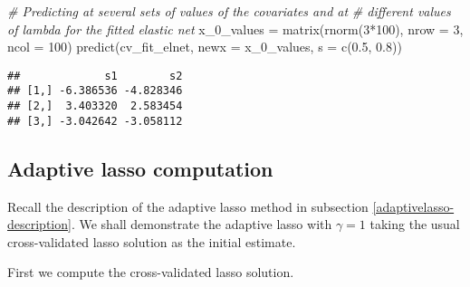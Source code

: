 \documentclass[
]{book}
\newenvironment{Shaded}{\begin{snugshade}}{\end{snugshade}}
\newcommand{\AttributeTok}[1]{\textcolor[rgb]{0.77,0.63,0.00}{#1}}
\newcommand{\CommentTok}[1]{\textcolor[rgb]{0.56,0.35,0.01}{\textit{#1}}}
\newcommand{\DecValTok}[1]{\textcolor[rgb]{0.00,0.00,0.81}{#1}}
\newcommand{\FloatTok}[1]{\textcolor[rgb]{0.00,0.00,0.81}{#1}}
\newcommand{\FunctionTok}[1]{\textcolor[rgb]{0.00,0.00,0.00}{#1}}
\newcommand{\NormalTok}[1]{#1}
\newcommand{\OtherTok}[1]{\textcolor[rgb]{0.56,0.35,0.01}{#1}}
\newcommand{\SpecialCharTok}[1]{\textcolor[rgb]{0.00,0.00,0.00}{#1}}
\begin{document}
\begin{Shaded}
\begin{Highlighting}[]
\CommentTok{\# Predicting at several sets of values of the covariates and at}
\CommentTok{\# different values of lambda for the fitted elastic net}
\NormalTok{x\_0\_values }\OtherTok{=} \FunctionTok{matrix}\NormalTok{(}\FunctionTok{rnorm}\NormalTok{(}\DecValTok{3}\SpecialCharTok{*}\DecValTok{100}\NormalTok{), }\AttributeTok{nrow =} \DecValTok{3}\NormalTok{, }\AttributeTok{ncol =} \DecValTok{100}\NormalTok{)}
\FunctionTok{predict}\NormalTok{(cv\_fit\_elnet, }\AttributeTok{newx =}\NormalTok{ x\_0\_values, }\AttributeTok{s =} \FunctionTok{c}\NormalTok{(}\FloatTok{0.5}\NormalTok{, }\FloatTok{0.8}\NormalTok{))}
\end{Highlighting}
\end{Shaded}

\begin{verbatim}
##             s1        s2
## [1,] -6.386536 -4.828346
## [2,]  3.403320  2.583454
## [3,] -3.042642 -3.058112
\end{verbatim}

\hypertarget{adaptivelasso-computation}{%
\subsection{Adaptive lasso computation}\label{adaptivelasso-computation}}

Recall the description of the adaptive lasso method in subsection \ref{adaptivelasso-description}. We shall demonstrate the adaptive lasso with \(\gamma = 1\) taking the usual cross-validated lasso solution as the initial estimate.

First we compute the cross-validated lasso solution.
\end{document}
